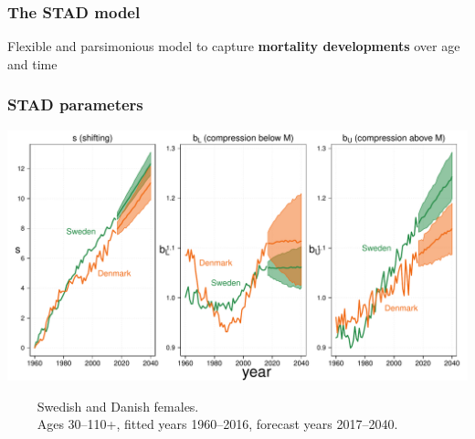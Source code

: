 \documentclass[12pt, xcolor=table]{beamer}  %
\begin{document}
\begin{frame}\frametitle{The STAD model}
\begin{center}
\vspace{-0.1cm}
Flexible and parsimonious model to capture \textbf{mortality developments} over age and time \\
\end{center}

\end{frame}


%	
%	
%		
%		
%	

\begin{frame}\frametitle{STAD parameters}
	
	\vspace{-0.75cm}
	
	\begin{center}	
		\vspace{0.2cm}
		
		\includegraphics[scale=.43]{Figures/Ch2/F3_2_new}
		
	\end{center}
\vspace{-0.2cm}
\tiny{$\quad\quad$ Swedish and Danish females. \\ $\quad\quad$ Ages 30--110+, fitted years 1960--2016, forecast years 2017--2040.}
	
\end{frame}
\end{document}
